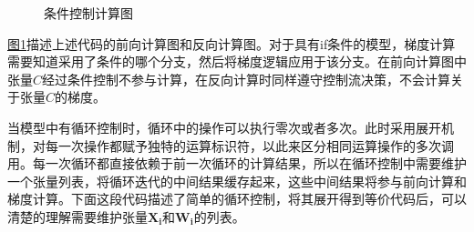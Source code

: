 \documentclass[letterpaper,10pt,english]{sphinxmanual}
\let\sphinxpxdimen\pdfpxdimen\else\newdimen\sphinxpxdimen
\begin{document}
\begin{figure}[H]
\centering
\capstart

\noindent\sphinxincludegraphics[width=600\sphinxpxdimen]{{if}.svg}
\caption{条件控制计算图}\label{\detokenize{chapter_computational_graph/components_of_computational_graph:id13}}\label{\detokenize{chapter_computational_graph/components_of_computational_graph:if}}\end{figure}

\sphinxAtStartPar
\hyperref[\detokenize{chapter_computational_graph/components_of_computational_graph:if}]{图\ref{\detokenize{chapter_computational_graph/components_of_computational_graph:if}}}描述上述代码的前向计算图和反向计算图。对于具有if\sphinxhyphen{}条件的模型，梯度计算需要知道采用了条件的哪个分支，然后将梯度逻辑应用于该分支。在前向计算图中张量\({C}\)经过条件控制不参与计算，在反向计算时同样遵守控制流决策，不会计算关于张量\(C\)的梯度。

\sphinxAtStartPar
当模型中有循环控制时，循环中的操作可以执行零次或者多次。此时采用展开机制，对每一次操作都赋予独特的运算标识符，以此来区分相同运算操作的多次调用。每一次循环都直接依赖于前一次循环的计算结果，所以在循环控制中需要维护一个张量列表，将循环迭代的中间结果缓存起来，这些中间结果将参与前向计算和梯度计算。下面这段代码描述了简单的循环控制，将其展开得到等价代码后，可以清楚的理解需要维护张量\(\boldsymbol{X_i}\)和\(\boldsymbol{W_i}\)的列表。

\begin{sphinxVerbatim}[commandchars=\\\{\}]
      \PYG{p}{[}\PYG{p}{]}   
       
           \PYG{p}{[}\PYG{p}{]}
     
      \PYG{p}{[}\PYG{p}{]}
          
       
       
     
\end{sphinxVerbatim}
\end{document}
